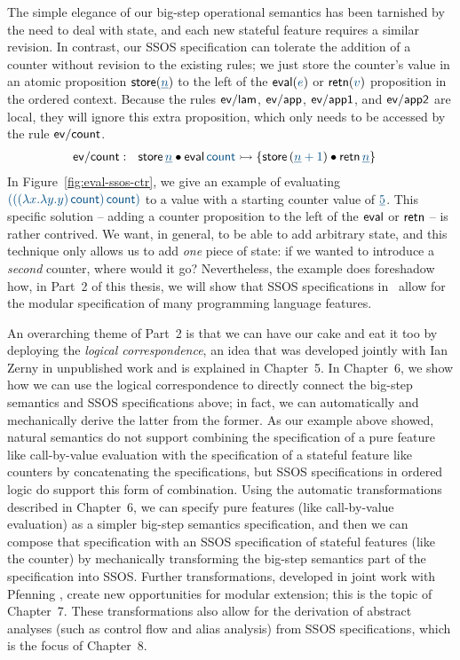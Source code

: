 The simple elegance of our big-step operational semantics has been
tarnished by the need to deal with state, and each new stateful
feature requires a similar revision.  In contrast, our SSOS
specification can tolerate the addition of a counter without revision
to the existing rules; we just store the counter's value in an atomic
proposition ${\sf store}(\obj{\underline{n}})$ to the left of the ${\sf
  eval}(\obj{e})$ or ${\sf retn}(\obj{v})$ proposition in the ordered
context. Because the rules ${\sf ev/lam}$, ${\sf ev/app}$, ${\sf
  ev/app1}$, and ${\sf ev/app2}$ are local, they will ignore this
extra proposition, which only needs to be accessed by the rule ${\sf
  ev/count}$.
\begin{align*}
{\sf ev/count} &:~~
  {\sf store}\,\obj{\underline n} \fuse {\sf eval}\,\obj{{\sf count}}
    \lefti \{ {\sf store}\,(\obj{\underline n + 1}) 
      \fuse {\sf retn}\,\obj{\underline n} \}
\end{align*}
In Figure~\ref{fig:eval-ssos-ctr}, we give an example of evaluating
$\obj{(((\lambda x.\lambda y.y)\,{\sf count})\,{\sf count})}$ to a
value with a starting counter value of $\obj{\underline 5}$. This
specific solution -- adding a counter proposition to the left of the
${\sf eval}$ or ${\sf retn}$ -- is rather contrived. We want, in
general, to be able to add arbitrary state, and this technique only
allows us to add {\it one} piece of state: if we wanted to introduce a
{\it second} counter, where would it go? Nevertheless, the example
does foreshadow how, in Part~2 of this thesis, we will show that SSOS
specifications in \sls~allow for the modular specification of many
programming language features.


An overarching theme of Part~2 is that we can have our cake and eat it
too by deploying the {\it logical correspondence}, an idea that was
developed jointly with Ian Zerny in unpublished work and is explained
in Chapter~5. In Chapter~6, we show how we can use the logical
correspondence to directly connect the big-step semantics and SSOS
specifications above; in fact, we can automatically and mechanically
derive the latter from the former. As our example above showed,
natural semantics do not support combining the specification of a pure
feature like call-by-value evaluation with the specification of a
stateful feature like counters by concatenating the specifications,
but SSOS specifications in ordered logic do support this form of
combination. Using the automatic transformations described in
Chapter~6, we can specify pure features (like call-by-value
evaluation) as a simpler big-step semantics specification, and then we
can compose that specification with an SSOS specification of stateful
features (like the counter) by mechanically transforming the big-step
semantics part of the specification into SSOS. Further
transformations, developed in joint work with Pfenning
\cite{simmons11logical}, create new opportunities for modular
extension; this is the topic of Chapter~7. These transformations also
allow for the derivation of abstract analyses (such as control flow
and alias analysis) from SSOS specifications, which is the focus of
Chapter~8.

